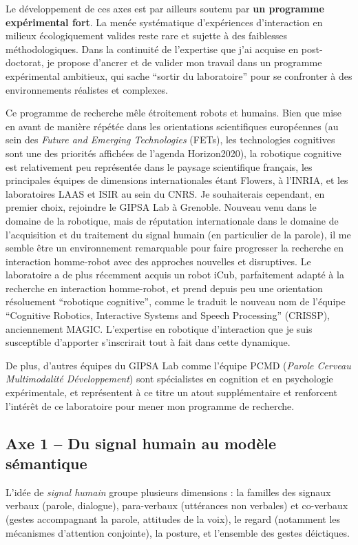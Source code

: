 \documentclass[a4paper]{article}
\begin{document}
Le développement de ces axes est par ailleurs soutenu par \textbf{un programme
expérimental fort}. La menée systématique d'expériences d'interaction en milieux
écologiquement valides reste rare et sujette à des faiblesses méthodologiques.
Dans la continuité de l'expertise que j'ai acquise en post-doctorat, je propose
d'ancrer et de valider mon travail dans un programme expérimental ambitieux, qui
sache ``sortir du laboratoire'' pour se confronter à des environnements
réalistes et complexes.

Ce programme de recherche mêle étroitement robots et humains. Bien que mise en
avant de manière répétée dans les orientations scientifiques européennes (au
sein des \emph{Future and Emerging Technologies} (FETs), les technologies
cognitives sont une des priorités affichées de l'agenda Horizon2020), la
robotique cognitive est relativement peu représentée dans le paysage
scientifique français, les principales équipes de dimensions internationales
étant Flowers, à l'INRIA, et les laboratoires LAAS et ISIR au sein du CNRS. Je
souhaiterais cependant, en premier choix, rejoindre le GIPSA Lab à Grenoble.
Nouveau venu dans le domaine de la robotique, mais de réputation internationale
dans le domaine de l'acquisition et du traitement du signal humain (en
particulier de la parole), il me semble être un environnement remarquable pour
faire progresser la recherche en interaction homme-robot avec des approches
nouvelles et disruptives. Le laboratoire a de plus récemment acquis un robot iCub,
parfaitement adapté à la recherche en interaction homme-robot, et prend depuis
peu une orientation résoluement ``robotique cognitive'', comme le traduit le
nouveau nom de l'équipe ``Cognitive Robotics, Interactive Systems and Speech
Processing'' (CRISSP), anciennement MAGIC.  L'expertise en robotique
d'interaction que je suis susceptible d'apporter s'inscrirait tout à fait dans
cette dynamique.

De plus, d'autres équipes du GIPSA Lab comme l'équipe PCMD (\emph{Parole
Cerveau Multimodalité Développement}) sont spécialistes en cognition et en
psychologie expérimentale, et représentent à ce titre un atout supplémentaire et
renforcent l'intérêt de ce laboratoire pour mener mon programme de recherche.

\subsection*{Axe 1 -- Du signal humain au modèle sémantique}

L'idée de \emph{signal humain} groupe plusieurs dimensions : la familles des
signaux verbaux (parole, dialogue), para-verbaux (uttérances non verbales) et
co-verbaux (gestes accompagnant la parole, attitudes de la voix), le regard
(notamment les mécanismes d'attention conjointe), la posture, et l'ensemble des
gestes déictiques.
\end{document}
